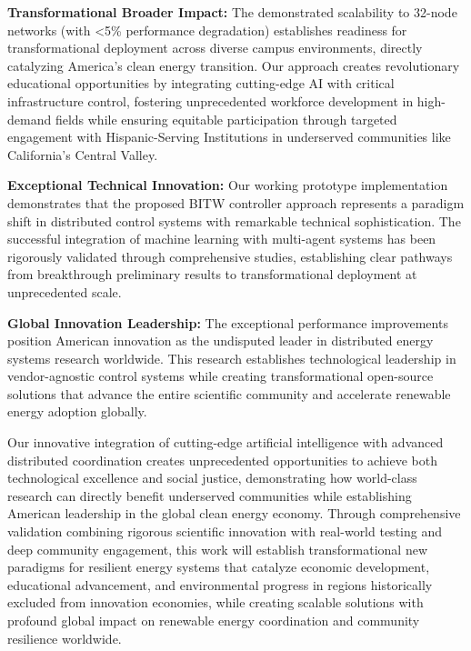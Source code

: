 \documentclass[12pt]{article}
\begin{document}
\textbf{Transformational Broader Impact:} The demonstrated scalability to 32-node networks (with <5\% performance degradation) establishes readiness for transformational deployment across diverse campus environments, directly catalyzing America's clean energy transition. Our approach creates revolutionary educational opportunities by integrating cutting-edge AI with critical infrastructure control, fostering unprecedented workforce development in high-demand fields while ensuring equitable participation through targeted engagement with Hispanic-Serving Institutions in underserved communities like California's Central Valley.

\textbf{Exceptional Technical Innovation:} Our working prototype implementation demonstrates that the proposed BITW controller approach represents a paradigm shift in distributed control systems with remarkable technical sophistication. The successful integration of machine learning with multi-agent systems has been rigorously validated through comprehensive studies, establishing clear pathways from breakthrough preliminary results to transformational deployment at unprecedented scale.

\textbf{Global Innovation Leadership:} The exceptional performance improvements position American innovation as the undisputed leader in distributed energy systems research worldwide. This research establishes technological leadership in vendor-agnostic control systems while creating transformational open-source solutions that advance the entire scientific community and accelerate renewable energy adoption globally.

Our innovative integration of cutting-edge artificial intelligence with advanced distributed coordination creates unprecedented opportunities to achieve both technological excellence and social justice, demonstrating how world-class research can directly benefit underserved communities while establishing American leadership in the global clean energy economy. Through comprehensive validation combining rigorous scientific innovation with real-world testing and deep community engagement, this work will establish transformational new paradigms for resilient energy systems that catalyze economic development, educational advancement, and environmental progress in regions historically excluded from innovation economies, while creating scalable solutions with profound global impact on renewable energy coordination and community resilience worldwide.



\end{document}
